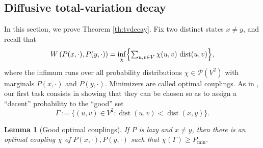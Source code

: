\documentclass[JEP,XML,SOM,Unicode,NoEqCountersInSection,published]{cedram}
\newtheorem{lemma}{Lemma}
\theoremstyle{definition}
\newcommand{\cP}{\mathcal{P}}
\newcommand{\pmin}{P_{\mathrm{min}}}
\DeclareMathOperator{\dist}{dist}
\begin{document}
\subsection{Diffusive total-variation decay}
\label{sec:tvdecay}
In this section, we prove Theorem \ref{th:tvdecay}. Fix two distinct states $x\ne y$, and recall that
\begin{equation*}
W\left(P(x,\cdot),P(y,\cdot)\right) = \inf_{\chi}\Bigl\{\textstyle\sum_{u,v\in V}\chi(u,v)\,\dist(u,v)\Bigr\},
\end{equation*}
where the infimum runs over all probability distributions $\chi\in\cP(V^2)$ with marginals $P(x,\cdot)$ and $P(y,\cdot)$. Minimizers are called optimal couplings. As in \cite{MR2316551,munch2019non}, our first task consists in showing that they can be chosen so as to assign a ``decent'' probability to the ``good'' set
\begin{equation*}
\Gamma := \bigl\{(u,v)\in V^2\colon \dist(u,v)<\dist(x,y) \bigr\}.
\end{equation*}
\begin{lemma}[Good optimal couplings] \label{lm:coupling}If $P$ is lazy and $x\ne y$, then there is an optimal coupling $\chi$ of $P(x,\cdot),P(y,\cdot)$ such that $\chi\left(\Gamma\right) \ge \pmin.$
\end{lemma}
\end{document}
